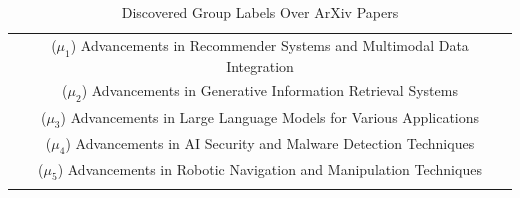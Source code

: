 \begin{footnotesize}
    

\begin{table}[t]

\centering
\caption{Discovered Group Labels Over ArXiv Papers}
\vspace{-.3cm}
\begin{tabular}{c}
\toprule
($\mu_1$) Advancements in Recommender Systems and Multimodal Data Integration\\

($\mu_2$) Advancements in Generative Information Retrieval Systems\\

($\mu_3$) Advancements in Large Language Models for Various Applications\\

($\mu_4$) Advancements in AI Security and Malware Detection Techniques\\

($\mu_5$) Advancements in Robotic Navigation and Manipulation Techniques\\
\bottomrule
\label{tab:groupby}

\end{tabular}
\vspace{-.5cm}

\end{table}

\end{footnotesize}
    
